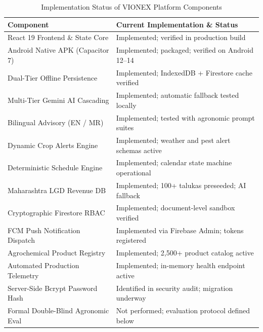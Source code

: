 \documentclass[conference]{IEEEtran}
\begin{document}
\begin{table}[htbp]
\caption{Implementation Status of VIONEX Platform Components}
\label{tab:status}
\centering
\begin{tabularx}{\columnwidth}{l X}
\toprule
\textbf{Component} & \textbf{Current Implementation \& Status} \\
\midrule
React 19 Frontend \& State Core & Implemented; verified in production build \\
Android Native APK (Capacitor 7) & Implemented; packaged; verified on Android 12--14 \\
Dual-Tier Offline Persistence & Implemented; IndexedDB + Firestore cache verified \\
Multi-Tier Gemini AI Cascading & Implemented; automatic fallback tested locally \\
Bilingual Advisory (EN / MR) & Implemented; tested with agronomic prompt suites \\
Dynamic Crop Alerts Engine & Implemented; weather and pest alert schemas active \\
Deterministic Schedule Engine & Implemented; calendar state machine operational \\
Maharashtra LGD Revenue DB & Implemented; 100+ talukas preseeded; AI fallback \\
Cryptographic Firestore RBAC & Implemented; document-level sandbox verified \\
FCM Push Notification Dispatch & Implemented via Firebase Admin; tokens registered \\
Agrochemical Product Registry & Implemented; 2,500+ product catalog active \\
Automated Production Telemetry & Implemented; in-memory health endpoint active \\
Server-Side Bcrypt Password Hash & Identified in security audit; migration underway \\
Formal Double-Blind Agronomic Eval & Not performed; evaluation protocol defined below \\
\bottomrule
\end{tabularx}
\end{table}
\end{document}
